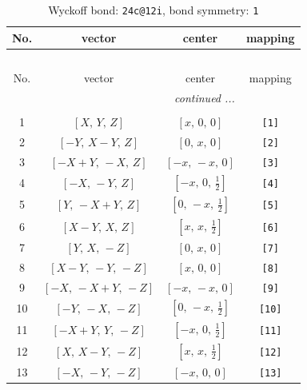 \documentclass[fleqn,8pt]{jsarticle}
\begin{document}
\begin{longtable}{cccc}
\caption{Wyckoff bond: {\tt 24c@12i}, bond symmetry: {\tt 1}}
 \\
 \hline \hline
No. & vector & center & mapping \\ \hline \endfirsthead

\multicolumn{3}{l}{\tablename\ \thetable{}} \\
 \hline \hline
No. & vector & center & mapping \\ \hline \endhead

 \hline \hline
\multicolumn{3}{r}{\footnotesize\it continued ...} \\ \endfoot

 \hline \hline
\multicolumn{3}{r}{} \\ \endlastfoot

1 & $\left[ X,\, Y,\, Z \right]$ & $\left[ x,\, 0,\, 0 \right]$ & {\tt [1]} \\ \hline
2 & $\left[ - Y,\, X - Y,\, Z \right]$ & $\left[ 0,\, x,\, 0 \right]$ & {\tt [2]} \\ \hline
3 & $\left[ - X + Y,\, - X,\, Z \right]$ & $\left[ - x,\, - x,\, 0 \right]$ & {\tt [3]} \\ \hline
4 & $\left[ - X,\, - Y,\, Z \right]$ & $\left[ - x,\, 0,\, \frac{1}{2} \right]$ & {\tt [4]} \\ \hline
5 & $\left[ Y,\, - X + Y,\, Z \right]$ & $\left[ 0,\, - x,\, \frac{1}{2} \right]$ & {\tt [5]} \\ \hline
6 & $\left[ X - Y,\, X,\, Z \right]$ & $\left[ x,\, x,\, \frac{1}{2} \right]$ & {\tt [6]} \\ \hline
7 & $\left[ Y,\, X,\, - Z \right]$ & $\left[ 0,\, x,\, 0 \right]$ & {\tt [7]} \\ \hline
8 & $\left[ X - Y,\, - Y,\, - Z \right]$ & $\left[ x,\, 0,\, 0 \right]$ & {\tt [8]} \\ \hline
9 & $\left[ - X,\, - X + Y,\, - Z \right]$ & $\left[ - x,\, - x,\, 0 \right]$ & {\tt [9]} \\ \hline
10 & $\left[ - Y,\, - X,\, - Z \right]$ & $\left[ 0,\, - x,\, \frac{1}{2} \right]$ & {\tt [10]} \\ \hline
11 & $\left[ - X + Y,\, Y,\, - Z \right]$ & $\left[ - x,\, 0,\, \frac{1}{2} \right]$ & {\tt [11]} \\ \hline
12 & $\left[ X,\, X - Y,\, - Z \right]$ & $\left[ x,\, x,\, \frac{1}{2} \right]$ & {\tt [12]} \\ \hline
13 & $\left[ - X,\, - Y,\, - Z \right]$ & $\left[ - x,\, 0,\, 0 \right]$ & {\tt [13]} \\ \hline

\end{longtable}
\end{document}
